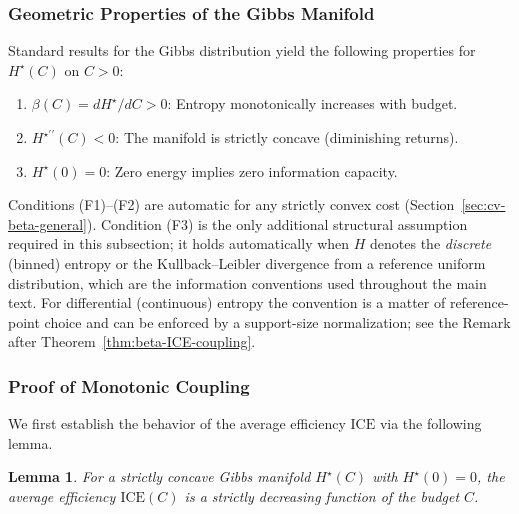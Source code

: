 \documentclass[11pt]{article}
\newtheorem{lemma}[theorem]{Lemma}
\theoremstyle{remark}
\theoremstyle{definition}
\begin{document}
\subsubsection{Geometric Properties of the Gibbs Manifold}

Standard results for the Gibbs distribution yield the following properties for $H^\star(C)$ on $C > 0$:
\begin{enumerate}[label=(F\arabic*)]
    \item $\beta(C) = dH^\star/dC > 0$: Entropy monotonically increases with budget.
    \item $H^{\star\prime\prime}(C) < 0$: The manifold is strictly concave (diminishing returns).
    \item $H^\star(0) = 0$: Zero energy implies zero information capacity.
\end{enumerate}
Conditions (F1)--(F2) are automatic for any strictly convex cost (Section~\ref{sec:cv-beta-general}).  Condition (F3) is the only additional structural assumption required in this subsection; it holds automatically when $H$ denotes the \emph{discrete} (binned) entropy or the Kullback--Leibler divergence from a reference uniform distribution, which are the information conventions used throughout the main text.  For differential (continuous) entropy the convention is a matter of reference-point choice and can be enforced by a support-size normalization; see the Remark after Theorem~\ref{thm:beta-ICE-coupling}.

\subsubsection{Proof of Monotonic Coupling}

We first establish the behavior of the average efficiency \(\mathrm{ICE}\) via the following lemma.

\begin{lemma}
\label{lemma:ice-monotonicity}
For a strictly concave Gibbs manifold \(H^\star(C)\) with \(H^\star(0)=0\), the average efficiency \(\mathrm{ICE}(C)\) is a strictly decreasing function of the budget \(C\).
\end{lemma}
\end{document}
